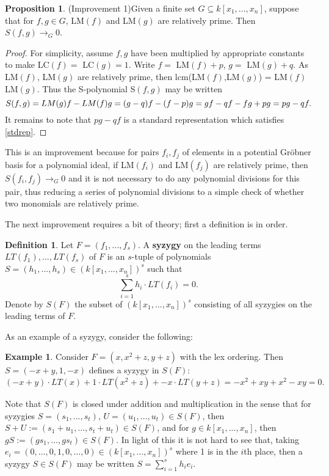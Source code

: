 \documentclass[reqno]{amsart}
\theoremstyle{definition}
\newtheorem{prop}[lem]{Proposition}
\theoremstyle{definition}
\newtheorem{defn}[lem]{Definition}
\newtheorem{ex}[lem]{Example}
\begin{document}
\begin{prop}{(Improvement 1)}\label{prop1}
Given a finite set $G\subseteq k[x_1,...,x_n]$, suppose that for $f,g\in G$, LM$(f)$ and LM$(g)$ are relatively prime. Then $S(f,g) \rightarrow_G 0$.
\end{prop}
\begin{proof}
For simplicity, assume $f,g$ have been multiplied by appropriate constants to make LC$(f) =$ LC$(g) = 1.$ Write $f =$ LM$(f) + p$, $g =$ LM$(g) + q$. As LM$(f)$, LM$(g)$ are relatively prime, then lcm(LM$(f)$,LM$(g)$) = LM$(f)$LM$(g)$. Thus the S-polynomial S$(f,g)$ may be written
$$S(f,g) = LM(g) f - LM(f) g
\\ = (g-q) f - (f-p) g
\\ = gf - qf - fg + pg
\\ = pg - qf.$$
It remains to note that $pg - qf$ is a standard representation which satisfies \ref{stdrep}.
\end{proof}

This is an improvement because for pairs $f_i,f_j$ of elements in a potential Gr{\"o}bner basis for a polynomial ideal, if LM$(f_i)$ and LM$(f_j)$ are relatively prime, then $S(f_i,f_j) \rightarrow_G 0$ and it is not necessary to do any polynomial divisions for this pair, thus reducing a series of polynomial divisions to a simple check of whether two monomials are relatively prime. 

The next improvement requires a bit of theory; first a definition is in order. 

\begin{defn}
Let $F = (f_1,...,f_s)$. A \textbf{syzygy} on the leading terms $LT(f_1),...,LT(f_s)$ of $F$ is an $s$-tuple of polynomials $S = (h_1,...,h_s)\in (k[x_1,...,x_n])^s$ such that $$\sum_{i=1}^s h_i\cdot LT(f_i) = 0.$$
Denote by $S(F)$ the subset of $(k[x_1,...,x_n])^s$ consisting of all syzygies on the leading terms of $F$. 
\end{defn}

As an example of a syzygy, consider the following: 
\begin{ex}
Consider $F = (x,x^2+z,y+z)$ with the lex ordering. Then $S = (-x+y,1,-x)$ defines a syzygy in $S(F)$: $$(-x+y)\cdot LT(x) + 1\cdot LT(x^2+z) + -x\cdot LT(y+z) = -x^2 +xy + x^2 -xy = 0.$$
\end{ex}

Note that $S(F)$ is closed under addition and multiplication in the sense that for syzygies $S = (s_1,...,s_t)$, $U = (u_1,...,u_t) \in S(F)$, then $S+U:=(s_1+u_1, ..., s_t+u_t)\in S(F)$, and for $g\in k[x_1,...,x_n]$, then $gS:=(gs_1,...,gs_t)\in S(F)$. In light of this it is not hard to see that, taking $e_i = (0,...,0,1,0,...,0)\in(k[x_1,...,x_n])^s$ where 1 is in the $i$th place, then a syzygy $S\in S(F)$ may be written $S = \sum_{i=1}^{s}h_ie_i.$ 
\end{document}

